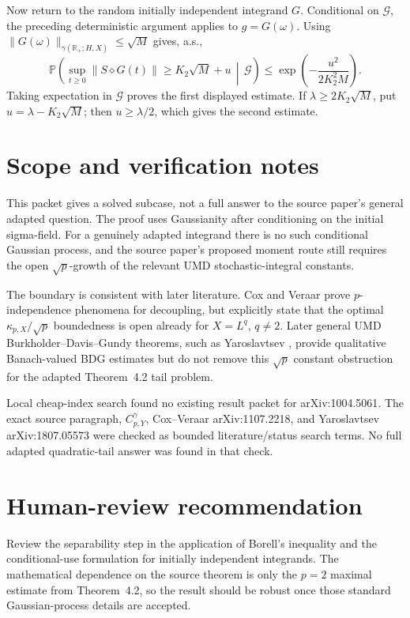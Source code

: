 \documentclass[11pt]{article}
\newcommand{\R}{\mathbb R}
\newcommand{\Pp}{\mathbb P}
\newcommand{\G}{\mathcal G}
\newcommand{\gam}{\gamma}
\begin{document}
Now return to the random initially independent integrand \(G\).  Conditional
on \(\G\), the preceding deterministic argument applies to \(g=G(\omega)\).
Using \(\|G(\omega)\|_{\gam(\R_+;H,X)}\le\sqrt M\) gives, a.s.,
\[
  \Pp\!\left(
      \sup_{t\ge0}\|S\diamond G(t)\|\ge K_2\sqrt M+u
      \,\middle|\,\G
    \right)
  \le
  \exp\!\left(-\frac{u^2}{2K_2^2M}\right).
\]
Taking expectation in \(\G\) proves the first displayed estimate.  If
\(\lambda\ge2K_2\sqrt M\), put \(u=\lambda-K_2\sqrt M\); then
\(u\ge\lambda/2\), which gives the second estimate.

\section*{Scope and verification notes}

This packet gives a solved subcase, not a full answer to the source paper's
general adapted question.  The proof uses Gaussianity after conditioning on
the initial sigma-field.  For a genuinely adapted integrand there is no such
conditional Gaussian process, and the source paper's proposed moment route
still requires the open \(\sqrt p\)-growth of the relevant UMD
stochastic-integral constants.

The boundary is consistent with later literature.  Cox and Veraar
\cite[p.~28]{CV1107} prove \(p\)-independence phenomena for decoupling, but
explicitly state that the optimal \(\kappa_{p,X}/\sqrt p\) boundedness is open
already for \(X=L^q\), \(q\ne2\).  Later general UMD Burkholder--Davis--Gundy
theorems, such as Yaroslavtsev \cite{Y1807}, provide qualitative
Banach-valued BDG estimates but do not remove this \(\sqrt p\) constant
obstruction for the adapted Theorem~4.2 tail problem.

Local cheap-index search found no existing result packet for arXiv:1004.5061.
The exact source paragraph, \(C_{p,Y}^{\gamma}\), Cox--Veraar arXiv:1107.2218,
and Yaroslavtsev arXiv:1807.05573 were checked as bounded literature/status
search terms.  No full adapted quadratic-tail answer was found in that check.

\section*{Human-review recommendation}

Review the separability step in the application of Borell's inequality and the
conditional-use formulation for initially independent integrands.  The
mathematical dependence on the source theorem is only the \(p=2\) maximal
estimate from Theorem~4.2, so the result should be robust once those standard
Gaussian-process details are accepted.
\end{document}
